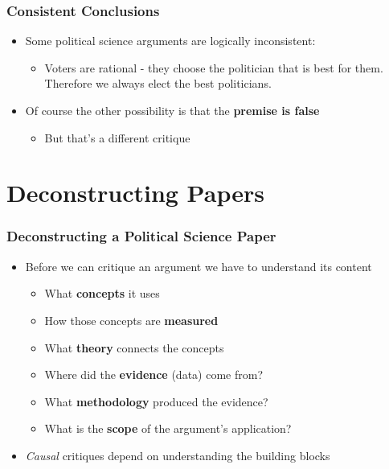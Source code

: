 \documentclass[xcolor=x11names,compress]{beamer}\usepackage[]{graphicx}\usepackage[]{color}
\renewcommand{\(}{\begin{columns}}
\renewcommand{\)}{\end{columns}}
\newcommand{\<}[1]{\begin{column}{#1}}
\renewcommand{\>}{\end{column}}
\begin{document}
\begin{frame}
\frametitle{Consistent Conclusions}
\begin{itemize}
\item Some political science arguments are logically inconsistent:
\begin{itemize}
\item Voters are rational - they choose the politician that is best for them. Therefore we always elect the best politicians.
\end{itemize}
\pause
\item Of course the other possibility is that the \textbf{premise is false}
\begin{itemize}
\item But that's a different critique
\end{itemize}
\end{itemize}
\end{frame}

\section{Deconstructing Papers}

\begin{frame}
\frametitle{Deconstructing a Political Science Paper}
\begin{itemize}
\item Before we can critique an argument we have to understand its content
\pause
\begin{itemize}
\item What \textbf{concepts} it uses
\pause
\item How those concepts are \textbf{measured}
\pause
\item What \textbf{theory} connects the concepts
\pause
\item Where did the \textbf{evidence} (data) come from?
\pause
\item What \textbf{methodology} produced the evidence?
\pause
\item What is the \textbf{scope} of the argument's application?
\end{itemize}
\item \textit{Causal} critiques depend on understanding the building blocks
\end{itemize}
\end{frame}
\end{document}
